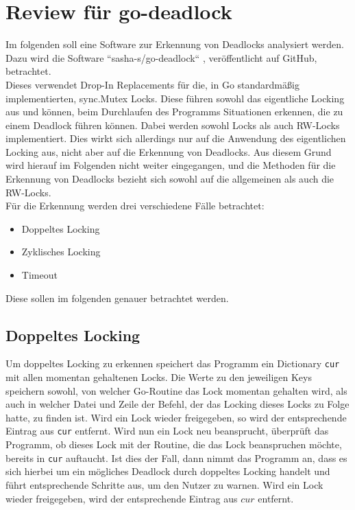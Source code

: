\chapter{Review für go-deadlock}\label{Chap::Review:go-deadlock}
Im folgenden soll eine Software zur Erkennung von Deadlocks analysiert werden.
Dazu wird die Software ``sasha-s/go-deadlock`` \cite{sasha-s}, veröffentlicht 
auf GitHub, betrachtet.\\
Dieses verwendet Drop-In Replacements für die, in Go standardmäßig 
implementierten, sync.Mutex Locks. Diese führen sowohl das eigentliche 
Locking aus und können, beim Durchlaufen des Programms Situationen erkennen, 
die zu einem Deadlock führen können. Dabei werden sowohl Locks
als auch RW-Locks implementiert. Dies wirkt sich allerdings nur auf
die Anwendung des eigentlichen Locking aus, nicht aber auf die Erkennung von 
Deadlocks. Aus diesem Grund wird hierauf im Folgenden nicht weiter eingegangen, 
und die Methoden für die Erkennung von Deadlocks bezieht sich sowohl auf die
allgemeinen als auch die RW-Locks.\\
Für die Erkennung werden drei verschiedene Fälle betrachtet:
\begin{itemize}
    \item Doppeltes Locking
    \item Zyklisches Locking
    \item Timeout
\end{itemize}
Diese sollen im folgenden genauer betrachtet werden.

\section{Doppeltes Locking}\label{Kap::Rev:Recursive}
Um doppeltes Locking zu erkennen speichert das Programm ein Dictionary \texttt{cur} mit 
allen momentan gehaltenen 
Locks. Die Werte zu den jeweiligen Keys speichern sowohl, von welcher Go-Routine das 
Lock momentan gehalten wird, als auch in welcher Datei und Zeile der Befehl,
der das Locking dieses Locks zu Folge hatte, zu finden ist. Wird ein Lock 
wieder freigegeben, so wird der entsprechende Eintrag aus \texttt{cur} entfernt. 
Wird nun ein Lock neu beansprucht, überprüft 
das Programm, ob dieses Lock mit der Routine, die das Lock beanspruchen möchte,
bereits in \texttt{cur} auftaucht. Ist dies der Fall, dann nimmt das
Programm an, dass es sich hierbei um ein mögliches Deadlock durch doppeltes Locking
handelt und führt 
entsprechende Schritte aus, um den Nutzer zu warnen. Wird ein Lock wieder freigegeben, wird der entsprechende Eintrag aus $cur$ entfernt.

